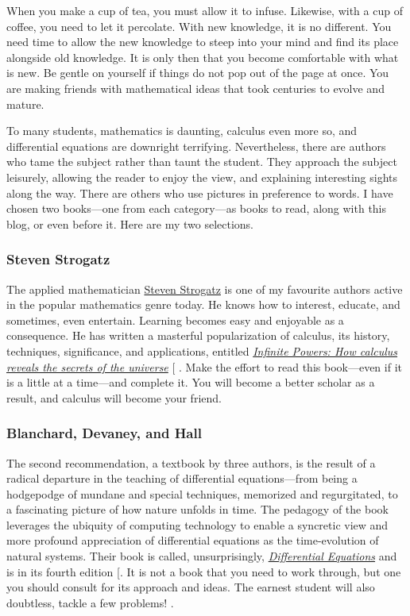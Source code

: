\documentclass[
  a4paper,
]{article}
\begin{document}
When you make a cup of tea, you must allow it to infuse. Likewise, with
a cup of coffee, you need to let it percolate. With new knowledge, it is
no different. You need time to allow the new knowledge to steep into
your mind and find its place alongside old knowledge. It is only then
that you become comfortable with what is new. Be gentle on yourself if
things do not pop out of the page at once. You are making friends with
mathematical ideas that took centuries to evolve and mature.

To many students, mathematics is daunting, calculus even more so, and
differential equations are downright terrifying. Nevertheless, there are
authors who tame the subject rather than taunt the student. They
approach the subject leisurely, allowing the reader to enjoy the view,
and explaining interesting sights along the way. There are others who
use pictures in preference to words. I have chosen two books---one from
each category---as books to read, along with this blog, or even before
it. Here are my two selections.

\subsubsection{Steven Strogatz}\label{steven-strogatz}

The applied mathematician
\href{https://en.wikipedia.org/wiki/Steven_Strogatz}{Steven Strogatz} is
one of my favourite authors active in the popular mathematics genre
today. He knows how to interest, educate, and sometimes, even entertain.
Learning becomes easy and enjoyable as a consequence. He has written a
masterful popularization of calculus, its history, techniques,
significance, and applications, entitled
\href{https://www.stevenstrogatz.com/books/infinite-powers}{\emph{Infinite
Powers: How calculus reveals the secrets of the universe}}
{[}\citeproc{ref-strogatz-2019}{1}{]} . Make the effort to read this
book---even if it is a little at a time---and complete it. You will
become a better scholar as a result, and calculus will become your
friend.

\subsubsection{Blanchard, Devaney, and
Hall}\label{blanchard-devaney-and-hall}

The second recommendation, a textbook by three authors, is the result of
a radical departure in the teaching of differential equations---from
being a hodgepodge of mundane and special techniques, memorized and
regurgitated, to a fascinating picture of how nature unfolds in time.
The pedagogy of the book leverages the ubiquity of computing technology
to enable a syncretic view and more profound appreciation of
differential equations as the time-evolution of natural systems. Their
book is called, unsurprisingly,
\href{http://math.bu.edu/odes/4ed-TOC.html}{\emph{Differential
Equations}} and is in its fourth edition
{[}\citeproc{ref-blanchard-devaney-hall-2012}{2}{]}. It is not a book
that you need to work through, but one you should consult for its
approach and ideas. The earnest student will also doubtless, tackle a
few problems!  \normalfont.
\end{document}
